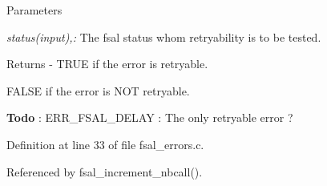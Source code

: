 \begin{DoxyParams}{Parameters}
\item[{\em status(input),:}]The fsal status whom retryability is to be tested.\end{DoxyParams}
\begin{DoxyReturn}{Returns}
-\/ TRUE if the error is retryable.
\begin{DoxyItemize}
\item FALSE if the error is NOT retryable. 
\end{DoxyItemize}
\end{DoxyReturn}


\begin{Desc}
\item[{\bf Todo}]: ERR\_\-FSAL\_\-DELAY : The only retryable error ? \end{Desc}


Definition at line 33 of file fsal\_\-errors.c.

Referenced by fsal\_\-increment\_\-nbcall().